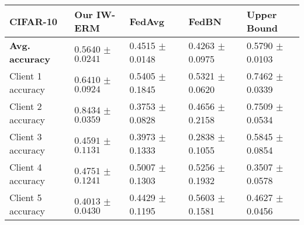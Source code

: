
\begin{tabular}{lllll}
\toprule
\textbf{CIFAR-10} &              Our IW-ERM &   FedAvg & FedBN & Upper Bound \\
\midrule
\textbf{Avg. accuracy}  & $\boldsymbol{0.5640}$ $\pm$ $\boldsymbol{0.0241}$ &0.4515 $\pm$ 0.0148 & 0.4263 $\pm$ 0.0975 &   0.5790 $\pm$ 0.0103 \\
Client 1 accuracy & $\boldsymbol{0.6410}$ $\pm$ $\boldsymbol{0.0924}$ & 0.5405 $\pm$ 0.1845 & 0.5321 $\pm$ 0.0620&0.7462 $\pm$ 0.0339 \\
Client 2 accuracy & $\boldsymbol{0.8434}$ $\pm$ $\boldsymbol{0.0359}$ & 0.3753 $\pm$ 0.0828 & 0.4656 $\pm$ 0.2158 & 0.7509 $\pm$ 0.0534 \\
Client 3 accuracy & $\boldsymbol{0.4591}$ $\pm$ $\boldsymbol{0.1131}$ & 0.3973 $\pm$ 0.1333 &  0.2838 $\pm$  0.1055 &         0.5845 $\pm$ 0.0854 \\
Client 4 accuracy & $\boldsymbol{0.4751}$ $\pm$ $\boldsymbol{0.1241}$ & 0.5007 $\pm$ 0.1303  & 0.5256 $\pm$ 0.1932  &         0.3507   $\pm$ 0.0578\\
Client 5 accuracy & $\boldsymbol{0.4013}$ $\pm$ $\boldsymbol{0.0430}$ & 0.4429 $\pm$ 0.1195 & 0.5603 $\pm$ 0.1581 & 0.4627 $\pm$ 0.0456\\
\bottomrule
\end{tabular}
